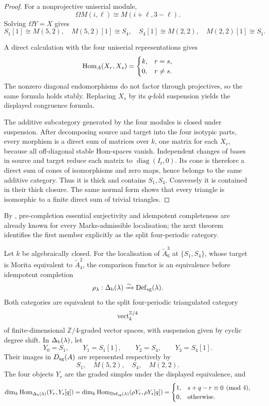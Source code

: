 \begin{proof}
For a nonprojective uniserial module,
\[
 \Omega M(i,\ell)\cong M(i+\ell,3-\ell).
\]
Solving \(\Omega Y=X\) gives
\[
 S_1[1]\cong M(5,2),
 \quad
 M(5,2)[1]\cong S_4,
 \quad
 S_4[1]\cong M(2,2),
 \quad
 M(2,2)[1]\cong S_1.
\]

A direct calculation with the four uniserial representations gives
\[
 \operatorname{Hom}_A(X_r,X_s)=
 \begin{cases}
 k,&r=s,\\
 0,&r\ne s.
 \end{cases}
\]
The nonzero diagonal endomorphisms do not factor through projectives, so the same formula holds stably.  Replacing \(X_s\) by its \(q\)-fold suspension yields the displayed congruence formula.

The additive subcategory generated by the four modules is closed under suspension.  After decomposing source and target into the four isotypic parts, every morphism is a direct sum of matrices over \(k\), one matrix for each \(X_r\), because all off-diagonal stable Hom-spaces vanish.  Independent changes of bases in source and target reduce each matrix to \(\operatorname{diag}(I_t,0)\).  Its cone is therefore a direct sum of cones of isomorphisms and zero maps, hence belongs to the same additive category.  Thus it is thick and contains \(S_1,S_4\).  Conversely it is contained in their thick closure.  The same normal form shows that every triangle is isomorphic to a finite direct sum of trivial triangles.
\end{proof}

By , pre-completion essential surjectivity and idempotent completeness are already known for every Marks-admissible localisation; the next theorem identifies the first member explicitly as the split four-periodic category.

\begin{theorem}\label{thm:a63-comparison}
Let \(k\) be algebraically closed.  For the localisation of \(\widetilde A^3_6\) at \(\{S_1,S_4\}\), whose target is Morita equivalent to \(\widetilde A^2_4\), the comparison functor is an equivalence before idempotent completion
\[
 \rho_\lambda:\Delta_{\mathrm b}(\lambda)
 \xrightarrow{\sim}
 \operatorname{Def}_{\mathrm{sg}}(\lambda).
\]
Both categories are equivalent to the split four-periodic triangulated category
\[
 \operatorname{vect}_k^{\mathbb Z/4}
\]
of finite-dimensional \(\mathbb Z/4\)-graded vector spaces, with suspension given by cyclic degree shift.  In \(\Delta_{\mathrm b}(\lambda)\), let
\[
 Y_0=S_1,
 \qquad Y_1=S_1[1],
 \qquad Y_2=S_4,
 \qquad Y_3=S_4[1].
\]
Their images in \(D_{\mathrm{sg}}(A)\) are represented respectively by
\[
 S_1,
 \quad M(5,2),
 \quad S_4,
 \quad M(2,2).
\]
The four objects \(Y_r\) are the graded simples under the displayed equivalence, and
\[
 \dim_k\operatorname{Hom}_{\Delta_{\mathrm b}(\lambda)}(Y_r,Y_s[q])
 =\dim_k\operatorname{Hom}_{\operatorname{Def}_{\mathrm{sg}}(\lambda)}(\rho Y_r,\rho Y_s[q])
 =\begin{cases}
 1,&s+q-r\equiv0\pmod4,\\
 0,&\text{otherwise}.
 \end{cases}
\]
\end{theorem}

